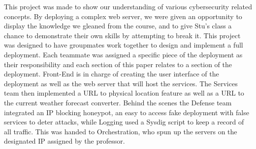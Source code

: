 This project was made to show our understanding of various cybersecurity related concepts. By deploying a complex web server, we were given an opportunity to display the knowledge we gleaned from the course, and to give Stu's class a chance to demonstrate their own skills by attempting to break it. This project was designed to have groupmates work together to design and implement a full deployment. Each teammate was assigned a specific piece of the deployment as their responsibility and each section of this paper relates to a section of the deployment. Front-End is in charge of creating the user interface of the deployment as well as the web server that will host the services. The Services team then implemented a URL to physical location feature as well as a URL to the current weather forecast converter. Behind the scenes the Defense team integrated an IP blocking honeypot, an easy to access fake deployment with false services \cite{nawrocki2016survey} to deter attacks, while Logging used a Sysdig script to keep a record of all traffic. This was handed to Orchestration, who spun up the servers on the designated IP assigned by the professor. 
